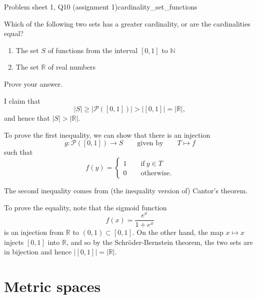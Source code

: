\begin{problem}{Problem sheet 1, Q10 (assignment 1)}{cardinality_set_functions}
    

    Which of the following two sets has a greater cardinality, or are the cardinalities equal?

    \begin{enumerate}
        \item The set $S$ of functions from the interval $[0, 1]$ to $\mathbb{N}$
        \item The set $\mathbb{R}$ of real numbers
    \end{enumerate}

    Prove your answer.

    \tcblower

    I claim that
        $$ \lvert S \rvert
            \geq \lvert \mathcal{P}([0, 1]) \rvert
            > \lvert [0, 1] \rvert
            = \lvert \mathbb{R} \rvert , $$
    and hence that $\lvert S \rvert > \lvert \mathbb{R} \rvert$.

    To prove the first inequality, we can show that there is an injection
        $$ g : \mathcal{P}([0, 1]) \to S 
            \qquad \text{given by} \qquad
            T \mapsto f$$
    such that
        $$ f(y) = 
            \begin{cases}
                1 \qquad \text{if} \ y \in T \\
                0 \qquad \text{otherwise}.
            \end{cases} $$

    The second inequality comes from (the inequality version of) Cantor's theorem.

    To prove the equality, note that the sigmoid function
        $$ f(x) = \frac{e^x}{1 + e^x} $$
    is an injection from $\mathbb{R}$ to $(0, 1) \subset [0, 1]$. On the other hand, the map $x \mapsto x$ injects $[0, 1]$ into $\mathbb{R}$, and so by the Schröder-Bernstein theorem, the two sets are in bijection and hence $\lvert [0, 1] \rvert = \lvert \mathbb{R} \rvert$.

\end{problem}

\section{Metric spaces}

